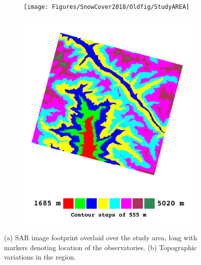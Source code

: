 \begin{figure}[htp]
\centering
\begin{subfigure}[b]{0.45\columnwidth}
\texttt{[image: Figures/SnowCover2018/Oldfig/StudyAREA]}
\end{subfigure}
\begin{subfigure}[b]{0.45\columnwidth}
\includegraphics[width=\textwidth]{Figures/SnowCover2018/Oldfig/Cropped_DEM_Manali_KML}
\end{subfigure}
\caption{(a) SAR image footprint overlaid over the study area, long with markers denoting location of the observatories. (b) Topographic variations in the region. }
\label{fig:observatory_study}
\end{figure}

